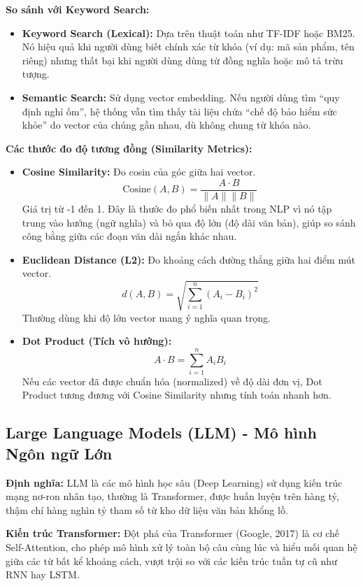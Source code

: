 \documentclass[12pt,a4paper]{report}
\begin{document}
\textbf{So sánh với Keyword Search:}
\begin{itemize}
    \item \textbf{Keyword Search (Lexical):} Dựa trên thuật toán như TF-IDF hoặc BM25. Nó hiệu quả khi người dùng biết chính xác từ khóa (ví dụ: mã sản phẩm, tên riêng) nhưng thất bại khi người dùng dùng từ đồng nghĩa hoặc mô tả trừu tượng.
    \item \textbf{Semantic Search:} Sử dụng vector embedding. Nếu người dùng tìm ``quy định nghỉ ốm'', hệ thống vẫn tìm thấy tài liệu chứa ``chế độ bảo hiểm sức khỏe'' do vector của chúng gần nhau, dù không chung từ khóa nào.
\end{itemize}

\textbf{Các thước đo độ tương đồng (Similarity Metrics):}
\begin{itemize}
    \item \textbf{Cosine Similarity:} Đo cosin của góc giữa hai vector.
    \[ \text{Cosine}(A, B) = \frac{A \cdot B}{\|A\| \|B\|} \]
    Giá trị từ -1 đến 1. Đây là thước đo phổ biến nhất trong NLP vì nó tập trung vào hướng (ngữ nghĩa) và bỏ qua độ lớn (độ dài văn bản), giúp so sánh công bằng giữa các đoạn văn dài ngắn khác nhau.
    \item \textbf{Euclidean Distance (L2):} Đo khoảng cách đường thẳng giữa hai điểm mút vector.
    \[ d(A, B) = \sqrt{\sum_{i=1}^{n} (A_i - B_i)^2} \]
    Thường dùng khi độ lớn vector mang ý nghĩa quan trọng.
    \item \textbf{Dot Product (Tích vô hướng):}
    \[ A \cdot B = \sum_{i=1}^{n} A_i B_i \]
    Nếu các vector đã được chuẩn hóa (normalized) về độ dài đơn vị, Dot Product tương đương với Cosine Similarity nhưng tính toán nhanh hơn.
\end{itemize}

\subsection{Large Language Models (LLM) - Mô hình Ngôn ngữ Lớn}
\textbf{Định nghĩa:} LLM là các mô hình học sâu (Deep Learning) sử dụng kiến trúc mạng nơ-ron nhân tạo, thường là Transformer, được huấn luyện trên hàng tỷ, thậm chí hàng nghìn tỷ tham số từ kho dữ liệu văn bản khổng lồ.

\textbf{Kiến trúc Transformer:} Đột phá của Transformer (Google, 2017) là cơ chế Self-Attention, cho phép mô hình xử lý toàn bộ câu cùng lúc và hiểu mối quan hệ giữa các từ bất kể khoảng cách, vượt trội so với các kiến trúc tuần tự cũ như RNN hay LSTM.
\end{document}
